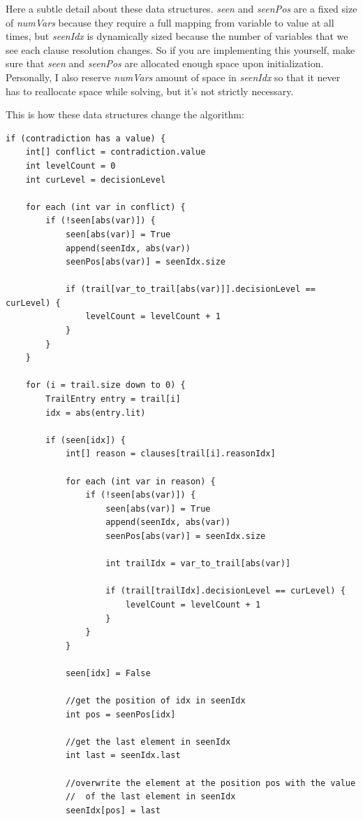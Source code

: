 \documentclass[oneside]{book}
\begin{document}
\noindent
Here a subtle detail about these data structures. \textit{seen} and \textit{seenPos}
are a fixed size of \textit{numVars} because they require a full mapping from variable
to value at all times, but \textit{seenIdx} is dynamically sized because the number of 
variables that we see each clause resolution changes. So if you are implementing this 
yourself, make sure that \textit{seen} and \textit{seenPos} are allocated enough space 
upon initialization. Personally, I also reserve \textit{numVars} amount of space in 
\textit{seenIdx} so that it never has to reallocate space while solving, but it's not 
strictly necessary. 

This is how these data structures change the algorithm:
\begin{lstlisting}
if (contradiction has a value) {
    int[] conflict = contradiction.value
    int levelCount = 0
    int curLevel = decisionLevel

    for each (int var in conflict) {
        if (!seen[abs(var)]) {
            seen[abs(var)] = True 
            append(seenIdx, abs(var))
            seenPos[abs(var)] = seenIdx.size

            if (trail[var_to_trail[abs(var)]].decisionLevel == curLevel) {
                levelCount = levelCount + 1
            }
        }
    }

    for (i = trail.size down to 0) {
        TrailEntry entry = trail[i]
        idx = abs(entry.lit)

        if (seen[idx]) {
            int[] reason = clauses[trail[i].reasonIdx]

            for each (int var in reason) {
                if (!seen[abs(var)]) {
                    seen[abs(var)] = True 
                    append(seenIdx, abs(var))
                    seenPos[abs(var)] = seenIdx.size

                    int trailIdx = var_to_trail[abs(var)]

                    if (trail[trailIdx].decisionLevel == curLevel) {
                        levelCount = levelCount + 1
                    }
                }
            }

            seen[idx] = False

            //get the position of idx in seenIdx
            int pos = seenPos[idx]

            //get the last element in seenIdx
            int last = seenIdx.last

            //overwrite the element at the position pos with the value 
            //  of the last element in seenIdx
            seenIdx[pos] = last 


\end{lstlisting}
\end{document}
